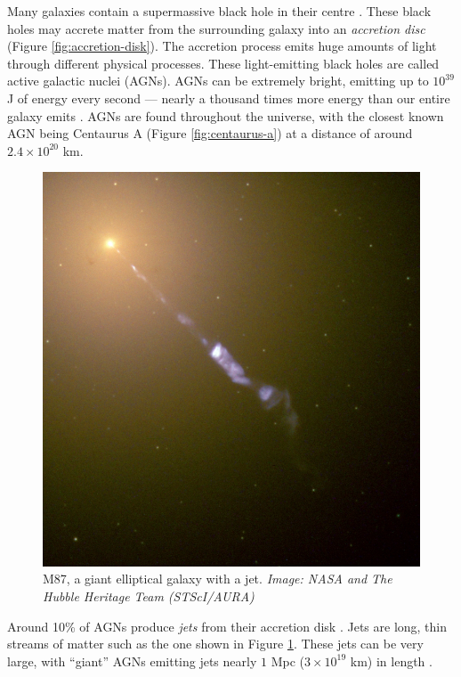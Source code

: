         Many galaxies contain a supermassive black hole in their centre
        \citep{richstone98}. These black holes may accrete matter from the
        surrounding galaxy into an \emph{accretion disc} (Figure
        \ref{fig:accretion-disk}). The accretion process emits huge amounts of
        light through different physical processes. These light-emitting black
        holes are called active galactic nuclei (AGNs). AGNs can be extremely
        bright, emitting up to $10^{39}$ J of energy every second --- nearly a
        thousand times more energy than our entire galaxy emits
        \citep{begelman84}. AGNs are found throughout the universe, with the
        closest known AGN being Centaurus A (Figure \ref{fig:centaurus-a}) at a
        distance of around $2.4 \times 10^{20}$ km.

        \begin{figure}
            \centering
            \includegraphics[height=0.3\textheight]{images/M87_jet.jpg}
            \caption{M87, a giant elliptical galaxy with a jet. \emph{Image:
                NASA and The Hubble Heritage Team (STScI/AURA)}}
            \label{fig:m87}
        \end{figure}

        Around 10\% of AGNs produce \emph{jets} from their accretion disk
        \citep{fabian99}. Jets are long, thin streams of matter such as the one
        shown in Figure \ref{fig:m87}. These jets can be very large, with
        ``giant'' AGNs emitting jets nearly $1$ Mpc ($3 \times 10^{19}$ km) in
        length \citep{saripalli05}.

